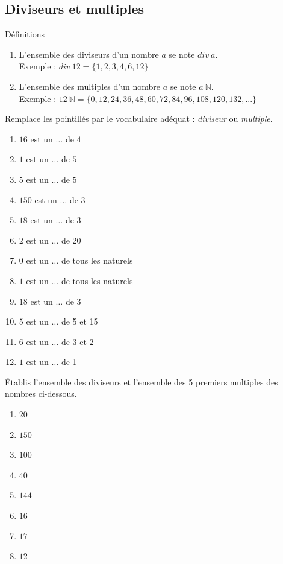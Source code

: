 \documentclass[10pt,a4paper]{article}
\begin{document}
	\subsection{Diviseurs et multiples}
		\begin{bclogo}[arrondi=0.3, logo=\bccle]{Définitions}
			\begin{enumerate}
				\item L'ensemble des diviseurs d'un nombre $a$ se note $div\ a$.\\
				Exemple : $div\ 12=\{1,2,3,4,6,12\}$
				\item L'ensemble des multiples d'un nombre $a$ se note $a\ \mathbb{N}$.\\
				Exemple : $12\ \mathbb{N}=\{0,12,24,36,48,60,72,84,96,108,120, 132, ...\}$
			\end{enumerate}
		\end{bclogo}

\begin{exercise}
	Remplace les pointillés par le vocabulaire adéquat : \textit{diviseur} ou \textit{multiple}.
	\begin{enumerate}[cols=3]
		\item $16$ est un $\ldots$ de $4$
		\item $1$ est un $\ldots$ de $5$
		\item $5$ est un $\ldots$ de $5$
		\item $150$ est un $\ldots$ de $3$
		\item $18$ est un $\ldots$ de $3$
		\item $2$ est un $\ldots$ de $20$
		\item $0$ est un $\ldots$ de  tous les naturels
		\item $1$ est un $\ldots$ de tous les naturels
		\item $ 18$ est un $\ldots$ de $3$
		\item $5$ est un $\ldots$ de 5 et 15
		\item $6$ est un $\ldots$ de 3 et 2
		\item $1$ est un $\ldots$ de 1
	\end{enumerate}
\end{exercise}

\begin{exercise}
	Établis l'ensemble des diviseurs et l'ensemble des 5 premiers multiples des nombres ci-dessous.
	\begin{enumerate}[cols=5]
		\item $20$
		\item $150$
		\item $100$
		\item $40$
		\item $144$
		\item $16$
		\item $17$
		\item $12$
	\end{enumerate}
\end{exercise} 
\end{document}
